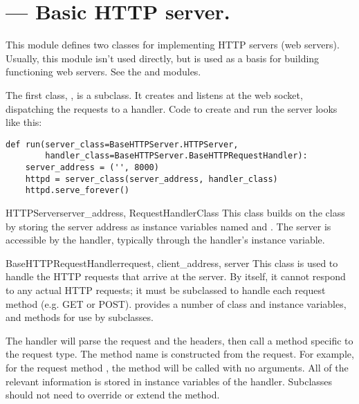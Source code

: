 \section{ ---
         Basic HTTP server.}





This module defines two classes for implementing HTTP servers
(web servers). Usually, this module isn't used directly, but is used
as a basis for building functioning web servers. See the
 and
 modules.

The first class, , is a
 subclass. It creates and listens at the
web socket, dispatching the requests to a handler. Code to create and
run the server looks like this:

\begin{verbatim}
def run(server_class=BaseHTTPServer.HTTPServer,
        handler_class=BaseHTTPServer.BaseHTTPRequestHandler):
    server_address = ('', 8000)
    httpd = server_class(server_address, handler_class)
    httpd.serve_forever()
\end{verbatim}

\begin{classdesc}{HTTPServer}{server_address, RequestHandlerClass}
This class builds on the  class by
storing the server address as instance
variables named  and . The
server is accessible by the handler, typically through the handler's
 instance variable.
\end{classdesc}

\begin{classdesc}{BaseHTTPRequestHandler}{request, client_address, server}
This class is used
to handle the HTTP requests that arrive at the server. By itself,
it cannot respond to any actual HTTP requests; it must be subclassed
to handle each request method (e.g. GET or POST).
 provides a number of class and instance
variables, and methods for use by subclasses.

The handler will parse the request and the headers, then call a
method specific to the request type. The method name is constructed
from the request. For example, for the request method , the
 method will be called with no arguments. All of
the relevant information is stored in instance variables of the
handler.  Subclasses should not need to override or extend the
 method.
\end{classdesc}


